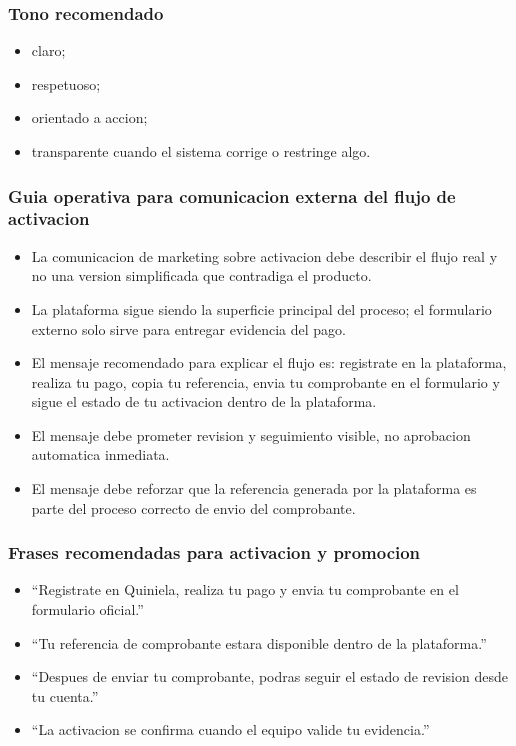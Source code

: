 \subsubsection{Tono recomendado}

\begin{itemize}
  \item claro;
  \item respetuoso;
  \item orientado a accion;
  \item transparente cuando el sistema corrige o restringe algo.
\end{itemize}

\subsubsection{Guia operativa para comunicacion externa del flujo de activacion}

\begin{itemize}
  \item La comunicacion de marketing sobre activacion debe describir el flujo real y no una version simplificada que contradiga el producto.
  \item La plataforma sigue siendo la superficie principal del proceso; el formulario externo solo sirve para entregar evidencia del pago.
  \item El mensaje recomendado para explicar el flujo es: registrate en la plataforma, realiza tu pago, copia tu referencia, envia tu comprobante en el formulario y sigue el estado de tu activacion dentro de la plataforma.
  \item El mensaje debe prometer revision y seguimiento visible, no aprobacion automatica inmediata.
  \item El mensaje debe reforzar que la referencia generada por la plataforma es parte del proceso correcto de envio del comprobante.
\end{itemize}

\subsubsection{Frases recomendadas para activacion y promocion}

\begin{itemize}
  \item ``Registrate en Quiniela, realiza tu pago y envia tu comprobante en el formulario oficial.''
  \item ``Tu referencia de comprobante estara disponible dentro de la plataforma.''
  \item ``Despues de enviar tu comprobante, podras seguir el estado de revision desde tu cuenta.''
  \item ``La activacion se confirma cuando el equipo valide tu evidencia.''
\end{itemize}

